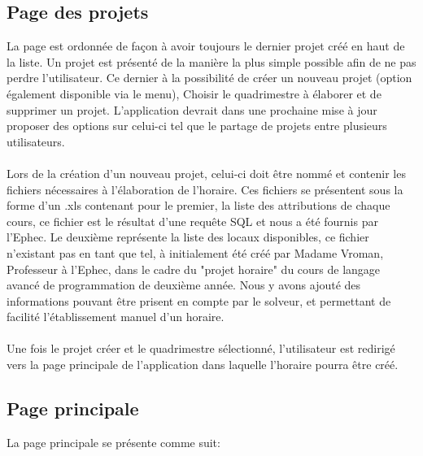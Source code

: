 \subsection{Page des projets}
La page est ordonnée de façon à avoir toujours le dernier projet créé en haut de la liste. Un projet est présenté de la manière la plus simple possible afin de ne pas perdre l'utilisateur. Ce dernier à la possibilité de créer un nouveau projet (option également disponible via le menu), Choisir le quadrimestre à élaborer et de supprimer un projet. L'application devrait dans une prochaine mise à jour proposer des options sur celui-ci tel que le partage de projets entre plusieurs utilisateurs.\\
\\
Lors de la création d'un nouveau projet, celui-ci doit être nommé et contenir les fichiers nécessaires à l'élaboration de l'horaire. Ces fichiers se présentent sous la forme d'un .xls contenant pour le premier, la liste des attributions de chaque cours, ce fichier est le résultat d'une requête SQL et nous a été fournis par l'Ephec. Le deuxième représente la liste des locaux disponibles, ce fichier n'existant pas en tant que tel, à initialement été créé par Madame Vroman, Professeur à l'Ephec, dans le cadre du "projet horaire" du cours de langage avancé de programmation de deuxième année. Nous y avons ajouté des informations pouvant être prisent en compte par le solveur, et permettant de facilité l'établissement manuel d'un horaire.\\
\\
Une fois le projet créer et le quadrimestre sélectionné, l'utilisateur est redirigé vers la page principale de l'application dans laquelle l'horaire pourra être créé.

\subsection{Page principale}
La page principale se présente comme suit:\\


